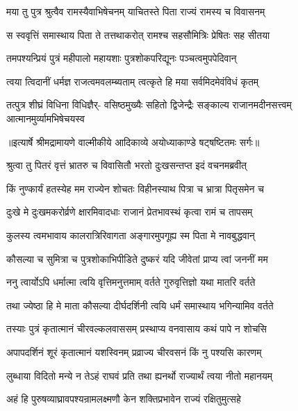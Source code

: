 \twolineshloka
{मया तु पुत्र श्रुत्वैव रामस्यैवाभिषेचनम्}
{याचितस्ते पिता राज्यं रामस्य च विवासनम्} %

\twolineshloka
{स स्ववृत्तिं समास्थाय पिता ते तत्तथाकरोत्}
{रामश्च सहसौमित्रिः प्रेषितः सह सीतया} %

\twolineshloka
{तमपश्यन्प्रियं पुत्रं महीपालो महायशाः}
{पुत्रशोकपरिद्यूनः पञ्चत्वमुपपेदिवान्} %

\twolineshloka
{त्वया त्विदानीं धर्मज्ञ राजत्वमवलम्ब्यताम्}
{त्वत्कृते हि मया सर्वमिदमेवंविधं कृतम्} %

\fourlineindentedshloka
{तत्पुत्र शीघ्रं विधिना विधिज्ञैर्-}
{वसिष्ठमुख्यैः सहितो द्विजेन्द्रैः}
{सङ्काल्य राजानमदीनसत्त्वम्}
{आत्मानमुर्व्यामभिषेचयस्व} %


{॥इत्यार्षे श्रीमद्रामायणे वाल्मीकीये आदिकाव्ये अयोध्याकाण्डे षट्षष्टितमः सर्गः॥}


\twolineshloka
{श्रुत्वा तु पितरं वृत्तं भ्रातरु च विवासितौ}
{भरतो दुःखसन्तप्त इदं वचनमब्रवीत्} %

\twolineshloka
{किं नुण्कार्यं हतस्येह मम राज्येन शोचतः}
{विहीनस्याथ पित्रा च भ्रात्रा पितृसमेन च} %

\twolineshloka
{दुःखे मे दुःखमकरोर्व्रणे क्षारमिवादधाः}
{राजानं प्रेतभावस्थं कृत्वा रामं च तापसम्} %

\twolineshloka
{कुलस्य त्वमभावाय कालरात्रिरिवागता}
{अङ्गारमुपगूह्य स्म पिता मे नावबुद्धवान्} %

\twolineshloka
{कौसल्या च सुमित्रा च पुत्रशोकाभिपीडिते}
{दुष्करं यदि जीवेतां प्राप्य त्वां जननीं मम} %

\twolineshloka
{ननु त्वार्योऽपि धर्मात्मा त्वयि वृत्तिमनुत्तमाम्}
{वर्तते गुरुवृत्तिज्ञो यथा मातरि वर्तते} %

\twolineshloka
{तथा ज्येष्ठा हि मे माता कौसल्या दीर्घदर्शिनी}
{त्वयि धर्मं समास्थाय भगिन्यामिव वर्तते} %

\twolineshloka
{तस्याः पुत्रं कृतात्मानं चीरवल्कलवाससम्}
{प्रस्थाप्य वनवासाय कथं पापे न शोचसि} %

\twolineshloka
{अपापदर्शिनं शूरं कृतात्मानं यशस्विनम्}
{प्रव्राज्य चीरवसनं किं नु पश्यसि कारणम्} %

\twolineshloka
{लुब्धाया विदितो मन्ये न तेऽहं राघवं प्रति}
{तथा ह्यनर्थो राज्यार्थं त्वया नीतो महानयम्} %

\twolineshloka
{अहं हि पुरुषव्याघ्रावपश्यन्रामलक्ष्मणौ}
{केन शक्तिप्रभावेन राज्यं रक्षितुमुत्सहे} %

